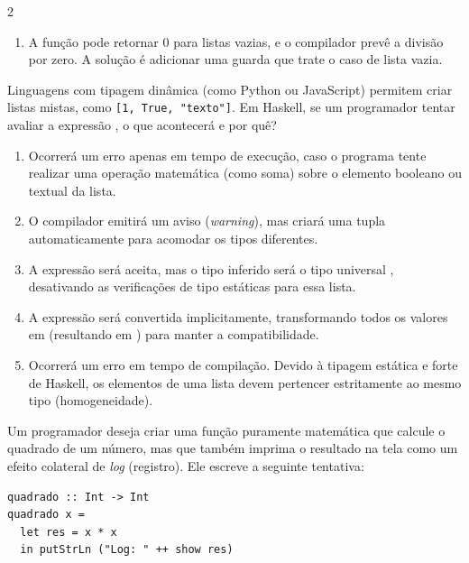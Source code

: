 \documentclass[a4paper,10pt,brazil]{article}
\begin{document}
\begin{multicols}{2}
\begin{enumerate}
  \item A função  pode retornar 0 para listas vazias, e o compilador prevê a divisão por zero. A solução é adicionar uma guarda que trate o caso de lista vazia.


\end{enumerate}

Linguagens com tipagem dinâmica (como Python ou JavaScript) permitem criar listas mistas, como \texttt{[1, True, "texto"]}. Em Haskell, se um programador tentar avaliar a expressão , o que acontecerá e por quê?

\begin{enumerate}
  \item Ocorrerá um erro apenas em tempo de execução, caso o programa tente realizar uma operação matemática (como soma) sobre o elemento booleano ou textual da lista.

  \item O compilador emitirá um aviso (\emph{warning}), mas criará uma tupla automaticamente para acomodar os tipos diferentes.

  \item A expressão será aceita, mas o tipo inferido será o tipo universal , desativando as verificações de tipo estáticas para essa lista.

  \item A expressão será convertida implicitamente, transformando todos os valores em  (resultando em ) para manter a compatibilidade.

  \item Ocorrerá um erro em tempo de compilação. Devido à tipagem estática e forte de Haskell, os elementos de uma lista devem pertencer estritamente ao mesmo tipo (homogeneidade).


\end{enumerate}

Um programador deseja criar uma função puramente matemática que calcule o quadrado de um número, mas que também imprima o resultado na tela como um efeito colateral de \emph{log} (registro). Ele escreve a seguinte tentativa:

\begin{verbatim}
quadrado :: Int -> Int
quadrado x = 
  let res = x * x
  in putStrLn ("Log: " ++ show res)
\end{verbatim}


\end{multicols}
\end{document}
